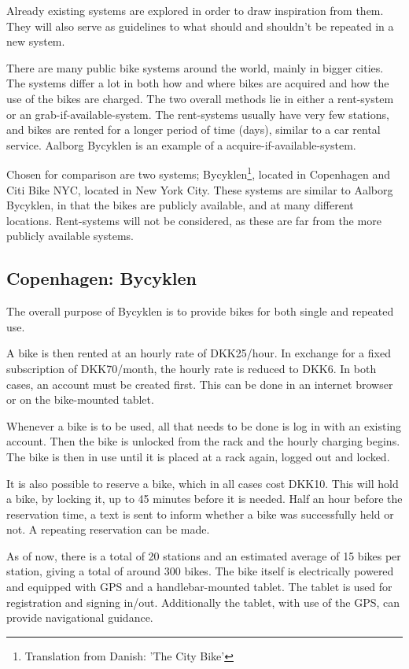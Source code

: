 Already existing systems are explored in order to draw inspiration from them.
They will also serve as guidelines to what should and shouldn't be repeated in a new system.

There are many public bike systems around the world, mainly in bigger cities.
The systems differ a lot in both how and where bikes are acquired and how the use of the bikes are charged.
The two overall methods lie in either a rent-system or an grab-if-available-system.
The rent-systems usually have very few stations, and bikes are rented for a longer period of time (days), similar to a car rental service.
Aalborg Bycyklen is an example of a acquire-if-available-system.

Chosen for comparison are two systems; Bycyklen\footnote{Translation from Danish: 'The City Bike'}, located in Copenhagen and Citi Bike NYC, located in New York City.
These systems are similar to Aalborg Bycyklen, in that the bikes are publicly available, and at many different locations.
Rent-systems will not be considered, as these are far from the more publicly available systems.

\subsection{Copenhagen: Bycyklen}
The overall purpose of Bycyklen\cite{cph_bycyklen} is to provide bikes for both single and repeated use.

A bike is then rented at an hourly rate of DKK25/hour.
In exchange for a fixed subscription of DKK70/month, the hourly rate is reduced to DKK6.
In both cases, an account must be created first.
This can be done in an internet browser or on the bike-mounted tablet.

Whenever a bike is to be used, all that needs to be done is log in with an existing account.
Then the bike is unlocked from the rack and the hourly charging begins.
The bike is then in use until it is placed at a rack again, logged out and locked.

It is also possible to reserve a bike, which in all cases cost DKK10.
This will hold a bike, by locking it, up to 45 minutes before it is needed.
Half an hour before the reservation time, a text is sent to inform whether a bike was successfully held or not.
A repeating reservation can be made.

As of now, there is a total of 20 stations and an estimated average of 15 bikes per station, giving a total of around 300 bikes.
The bike itself is electrically powered and equipped with GPS and a handlebar-mounted tablet.
The tablet is used for registration and signing in/out.
Additionally the tablet, with use of the GPS, can provide navigational guidance.


